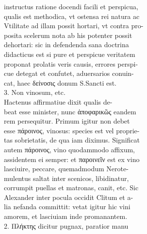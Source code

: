 \documentclass{article}
\begin{document}
\begin{pages}
                instructus ratione docendi facili et perspicua, \\
                qualis est methodica, vt ostensa rei natura ac \\
                Vtilitate ad illam possit hortari, vt contra pro- \\
                posita scelerum nota ab his potenter possit \\
                dehortari: sic in defendenda sana doctrina \\
                didacticus est si pure et perspicue veritatem \\
                proponat prolatis veris causis, errores perspi- \\
                cue detegat et confutet, aduersarios conuin- \\
                cat, haec δείνοσις donum S.Sancti est. \\
                3. Non vinosum, etc. \\
                Hactenus affirmatiue dixit qualis de- \\
                beat esse minister, nunc ἀποφαρικῶς eandem \\
                rem persequitur. Primum igitur non debet \\
                esse πάροινος, vinosus: species est vel proprie- \\
                tas sobrietatis, de qua iam diximus. Significat \\
                autem πάροινος, vino quodammodo affixum, \\
                assidentem ei semper: et παροινεῖν est ex vino \\
                lasciuire, peccare, quemadmodum Nerote- \\
                mulentus saltat inter scenicos, libidinatur, \\
                corrumpit puellas et matronas, canit, etc. Sic \\
                Alexander inter pocula occidit Clitum et a- \\
                lia nefanda committit: vetat igitur hic vini \\
                amorem, et lasciuiam inde promanantem. \\
                2. Πλήκτης dicitur pugnax, paratior manu \\

\end{pages}
\end{document}
